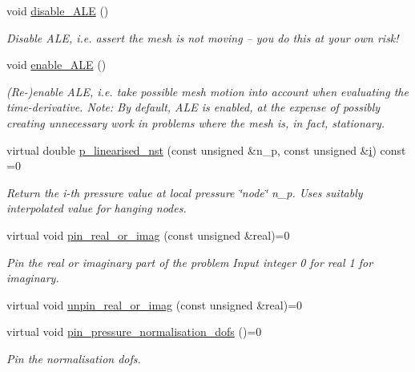 \begin{DoxyCompactItemize}
void \hyperlink{classoomph_1_1LinearisedNavierStokesEquations_a91f0b26ac8168653980bd3ab3d49cc65}{disable\+\_\+\+A\+LE} ()
\begin{DoxyCompactList}\small\item\em Disable A\+LE, i.\+e. assert the mesh is not moving -- you do this at your own risk! \end{DoxyCompactList}\item 
void \hyperlink{classoomph_1_1LinearisedNavierStokesEquations_aa23576e22f4395af47adc54f6e5a11ad}{enable\+\_\+\+A\+LE} ()
\begin{DoxyCompactList}\small\item\em (Re-\/)enable A\+LE, i.\+e. take possible mesh motion into account when evaluating the time-\/derivative. Note\+: By default, A\+LE is enabled, at the expense of possibly creating unnecessary work in problems where the mesh is, in fact, stationary. \end{DoxyCompactList}\item 
virtual double \hyperlink{classoomph_1_1LinearisedNavierStokesEquations_a7c3449ddb70e11667cb8926db5ce1174}{p\+\_\+linearised\+\_\+nst} (const unsigned \&n\+\_\+p, const unsigned \&\hyperlink{cfortran_8h_adb50e893b86b3e55e751a42eab3cba82}{i}) const =0
\begin{DoxyCompactList}\small\item\em Return the i-\/th pressure value at local pressure \char`\"{}node\char`\"{} n\+\_\+p. Uses suitably interpolated value for hanging nodes. \end{DoxyCompactList}\item 
virtual void \hyperlink{classoomph_1_1LinearisedNavierStokesEquations_a202921e1739b6aa174e1b64ebb1b14cd}{pin\+\_\+real\+\_\+or\+\_\+imag} (const unsigned \&real)=0
\begin{DoxyCompactList}\small\item\em Pin the real or imaginary part of the problem Input integer 0 for real 1 for imaginary. \end{DoxyCompactList}\item 
virtual void \hyperlink{classoomph_1_1LinearisedNavierStokesEquations_ae23ea66f0fd2679658946f790bd53ccd}{unpin\+\_\+real\+\_\+or\+\_\+imag} (const unsigned \&real)=0
\item 
virtual void \hyperlink{classoomph_1_1LinearisedNavierStokesEquations_a811cc53be5ee3239d31185b6264584f6}{pin\+\_\+pressure\+\_\+normalisation\+\_\+dofs} ()=0
\begin{DoxyCompactList}\small\item\em Pin the normalisation dofs. \end{DoxyCompactList}\item 

\end{DoxyCompactItemize}
